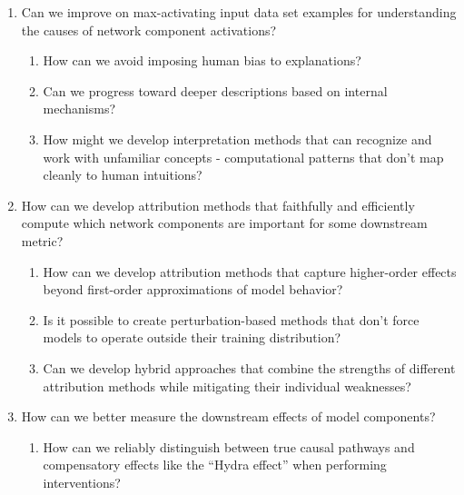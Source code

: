 \begin{enumerate}
    \item Can we improve on max-activating input data set examples for understanding the causes of network component activations?
    \begin{enumerate}[label=\alph*.]
        \item How can we avoid imposing human bias to explanations?
        \item Can we progress toward deeper descriptions based on internal mechanisms?
        \item How might we develop interpretation methods that can recognize and work with unfamiliar concepts - computational patterns that don't map cleanly to human intuitions?
    \end{enumerate}
    
    \item How can we develop attribution methods that faithfully and efficiently compute which network components are important for some downstream metric?
    \begin{enumerate}[label=\alph*.]
        \item How can we develop attribution methods that capture higher-order effects beyond first-order approximations of model behavior?
        \item Is it possible to create perturbation-based methods that don't force models to operate outside their training distribution?
        \item Can we develop hybrid approaches that combine the strengths of different attribution methods while mitigating their individual weaknesses?
    \end{enumerate}
    
    \item How can we better measure the downstream effects of model components?
    \begin{enumerate}[label=\alph*.]
        \item How can we reliably distinguish between true causal pathways and compensatory effects like the “Hydra effect” when performing interventions?
    \end{enumerate}
\end{enumerate}


